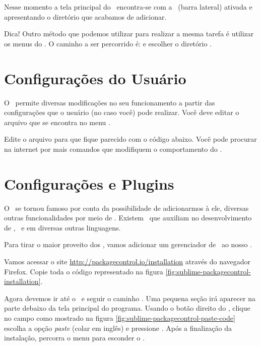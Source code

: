 Nesse momento a tela principal do \sublime~encontra-se com a \sideb~(barra lateral)
ativada e apresentando o diretório que acabamos de adicionar.


Dica! Outro método que podemos utilizar para realizar a mesma tarefa é utilizar
os menus do \sublime. O caminho a ser percorrido é: 
e escolher o diretório .


\section{Configurações do Usuário}
\label{configuracoes-do-usuario}

O \sublime~permite diversas modificações no seu funcionamento a partir das configurações
que o usuário (no caso você) pode realizar. Você deve editar o arquivo 
que se encontra no menu .

Edite o arquivo para que fique parecido com o código abaixo. Você pode procurar
na internet por mais comandos que modifiquem o comportamento do \sublime.



\section{Configurações e Plugins}
\label{configuracoes-e-plugins}

O \sublime~se tornou famoso por conta da possibilidade de adicionarmos à ele,
diversas outras funcionalidades por meio de \plugins. Existem \plugins~que auxiliam
no desenvolvimento de \html, \css~e em diversas outras linguagens.

Para tirar o maior proveito dos \plugins, vamos adicionar um gerenciador de
\plugins~ao nosso \sublime.

Vamos acessar o site \url{http://packagecontrol.io/installation} através do navegador 
Firefox. Copie toda o código representado na figura \ref{fig:sublime-packagecontrol-installation}.

Agora devemos ir até o \sublime~e seguir o caminho .
Uma pequena seção irá aparecer na parte debaixo da tela principal do programa.
Usando o botão direito do \mouse, clique no campo como mostrado na figura 
\ref{fig:sublime-packagecontrol-paste-code} escolha a opção \textit{paste} (colar em inglês)
e pressione \avancar. Após a finalização da instalação, percorra o menu  
para esconder o \terminal.

